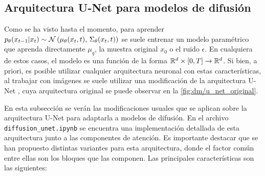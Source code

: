 

\subsection{Arquitectura U-Net para modelos de difusión}
\label{dm/discrete_dm/unet}

Como se ha visto hasta el momento, para aprender $p_\theta(x_{t-1}|x_t)\sim\mathcal{N}\left(\mu_\theta(x_t,t),\,\Sigma_\theta(x_t,t)\right)$ se suele entrenar un modelo paramétrico que aprenda directamente $\mu_q$, la muestra original $x_0$ o el ruido $\epsilon$. En cualquiera de estos casos, el modelo es una función de la forma $\mathbb{R}^d\times [0,T]\to\mathbb{R}^d$. Si bien, a priori, es posible utilizar cualquier arquitectura neuronal con estas características, al trabajar con imágenes se suele utilizar una modificación de la arquitectura U-Net \cite{ronneberger2015unet}, cuya arquitectura original se puede observar en la \autoref{fig:dm/u_net_original}.


En esta subsección se verán las modificaciones usuales que se aplican sobre la arquitectura U-Net para adaptarla a modelos de difusión. En el archivo \texttt{diffusion\_unet.ipynb} se encuentra una implementación detallada de esta arquitectura junto a las componentes de atención. Es importante destacar que se han propuesto distintas variantes para esta arquitectura, donde el factor común entre ellas son los bloques que las componen. Las principales características son las siguientes:

